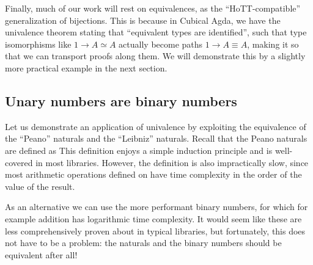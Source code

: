 Finally, %
much of our work will rest on equivalences, as the ``HoTT-compatible'' generalization of bijections. This is because in Cubical Agda, we have the univalence theorem 
stating that ``equivalent types are identified'', such that type isomorphisms like $1 \to A \simeq A$ actually become paths $1 \to A \equiv A$, making it so that we can transport proofs along them. We will demonstrate this by a slightly more practical example in the next section.


\subsection{Unary numbers are binary numbers}\label{ssec:binary}
Let us demonstrate an application of univalence by exploiting the equivalence of the ``Peano'' naturals and the ``Leibniz'' naturals. Recall that the Peano naturals are defined as 
This definition enjoys a simple induction principle and is well-covered in most libraries. However, the definition is also impractically slow, since most arithmetic operations defined on \bN{} have time complexity in the order of the value of the result.

As an alternative we can use the more performant binary numbers, for which for example addition has logarithmic time complexity. It would seem like these are less comprehensively proven about in typical libraries, but fortunately, this does not have to be a problem: the \bN{} naturals and the binary numbers should be equivalent after all!

